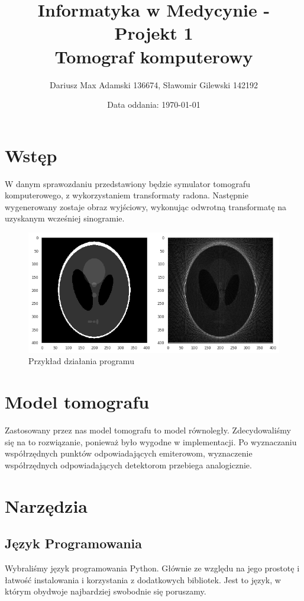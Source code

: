 \documentclass[11pt]{article}
\title{Informatyka w Medycynie - Projekt 1\\ Tomograf komputerowy}
\author{Dariusz Max Adamski 136674, Sławomir Gilewski 142192}
\affil{\{dariusz.adamski,slawomir.gilewski\}@student.put.poznan.pl}
\date{Data oddania: \today}
\begin{document}
\maketitle

\section*{Wstęp}

W danym sprawozdaniu przedstawiony będzie symulator tomografu komputerowego, z wykorzystaniem transformaty radona. Następnie wygenerowany zostaje obraz wyjściowy, wykonując odwrotną transformatę na uzyskanym wcześniej sinogramie. 

\begin{figure}[h!]
	\includegraphics[width=\linewidth]{res/demo.png}
	\caption{Przykład działania programu}
	\label{fig:demo}
\end{figure}


\section{Model tomografu}

Zastosowany przez nas model tomografu to model równoległy. Zdecydowaliśmy się na to rozwiązanie, ponieważ było wygodne w implementacji. Po wyznaczaniu współrzędnych punktów odpowiadających emiterowom, wyznaczenie współrzędnych odpowiadających detektorom przebiega analogicznie.

\section{Narzędzia}

\subsection{Język Programowania}
Wybraliśmy język programowania Python. Głównie ze względu na jego prostotę i łatwość instalowania i korzystania z dodatkowych bibliotek. Jest to język, w którym obydwoje najbardziej swobodnie się poruszamy.
\end{document}
